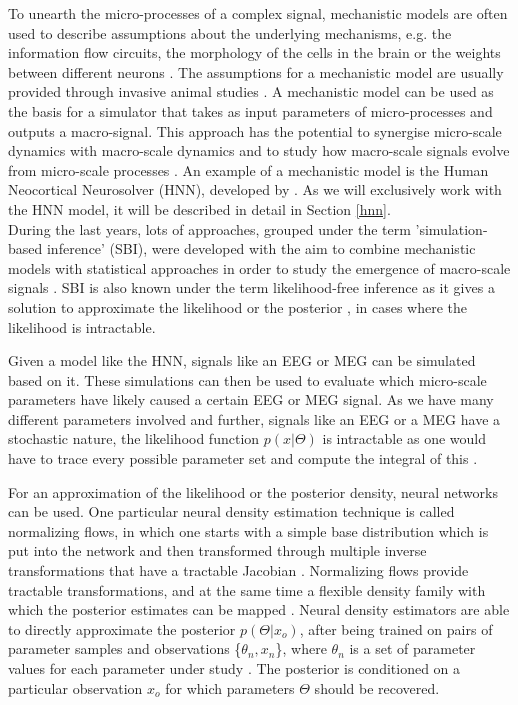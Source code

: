\documentclass[12pt]{extreport}
\begin{document}
To unearth the micro-processes of a complex signal, mechanistic models are often used to describe assumptions about the underlying mechanisms, e.g. the information flow circuits, the morphology of the cells in the brain or the weights between different neurons \citep{kohl2022neural}.  
The assumptions for a mechanistic model are usually provided through invasive animal studies \citep{kohl_neural_2021}. A mechanistic model can be used as the basis for a simulator that takes as input parameters of micro-processes and outputs a macro-signal. This approach has the potential to synergise micro-scale dynamics with macro-scale dynamics and to study how macro-scale signals evolve from micro-scale processes \citep{kohl_neural_2021}.
An example of a mechanistic model is the Human Neocortical Neurosolver (HNN), developed by \cite{neymotin2020human}. As we will exclusively work with the HNN model, it will be described in detail in Section \ref{hnn}.\\

During the last years, lots of approaches, grouped under the term 'simulation-based inference' (SBI), were developed with the aim to combine mechanistic models with statistical approaches in order to study the emergence of macro-scale signals \citep{goncalves2018flexible, gonccalves2020training, greenberg_automatic_2019}. 
SBI is also known under the term likelihood-free inference as it gives a solution to approximate the likelihood \citep{papamakarios2019sequential} or the posterior \citep{greenberg_automatic_2019, goncalves2018flexible, papamakarios2016fast}, in cases where the likelihood is intractable. 


Given a model like the HNN, signals like an EEG or MEG can be simulated based on it.  
These simulations can then be used to evaluate which micro-scale parameters have likely caused a certain EEG or MEG signal. 
As we have many different parameters involved and further, signals like an EEG or a MEG have a stochastic nature, the likelihood function $p(x|\Theta)$ is intractable as one would have to trace every possible parameter set and compute the integral of this \citep{cranmer2020frontier}. 

For an approximation of the likelihood or the posterior density, neural networks can be used. One particular neural density estimation technique is called normalizing flows, in which one starts with a simple base distribution which is put into the network and then transformed through multiple inverse transformations that have a tractable Jacobian \citep{cranmer2020frontier}. Normalizing flows provide tractable transformations, and at the same time a flexible density family with which the posterior estimates can be mapped \citep{cranmer2020frontier}. Neural density estimators are able to directly approximate the posterior $p(\Theta|x_o)$, after being trained on pairs of parameter samples and observations \{$\theta_n, x_n$\}, where $\theta_n$ is a set of parameter values for each parameter under study \citep{greenberg_automatic_2019, goncalves2018flexible, papamakarios2016fast}. The posterior is conditioned on a particular observation $x_o$ for which parameters $\Theta$ should be recovered.\\
\end{document}
